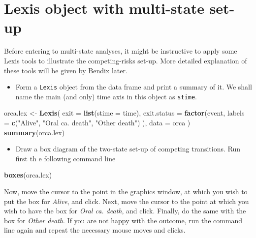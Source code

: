 \documentclass[
]{book}
\newenvironment{Shaded}{\begin{snugshade}}{\end{snugshade}}
\newcommand{\AttributeTok}[1]{\textcolor[rgb]{0.13,0.29,0.53}{#1}}
\newcommand{\FunctionTok}[1]{\textcolor[rgb]{0.13,0.29,0.53}{\textbf{#1}}}
\newcommand{\NormalTok}[1]{#1}
\newcommand{\OtherTok}[1]{\textcolor[rgb]{0.56,0.35,0.01}{#1}}
\newcommand{\StringTok}[1]{\textcolor[rgb]{0.31,0.60,0.02}{#1}}
\providecommand{\tightlist}{%
  \setlength{\itemsep}{0pt}\setlength{\parskip}{0pt}}
\begin{document}
\section{Lexis object with multi-state set-up}\label{lexis-object-with-multi-state-set-up}

Before entering to multi-state analyses, it might be instructive to apply some Lexis tools to illustrate the competing-risks set-up.
More detailed explanation of these tools will be given by Bendix later.

\begin{itemize}
\tightlist
\item
  Form a \texttt{Lexis} object from the data frame and
  print a summary of it. We shall name the main (and only) time axis
  in this object as \texttt{stime}.
\end{itemize}

\begin{Shaded}
\begin{Highlighting}[]
\NormalTok{orca.lex }\OtherTok{\textless{}{-}} \FunctionTok{Lexis}\NormalTok{(}
  \AttributeTok{exit =} \FunctionTok{list}\NormalTok{(}\AttributeTok{stime =}\NormalTok{ time),}
  \AttributeTok{exit.status =} \FunctionTok{factor}\NormalTok{(event,}
    \AttributeTok{labels =} \FunctionTok{c}\NormalTok{(}\StringTok{"Alive"}\NormalTok{, }\StringTok{"Oral ca. death"}\NormalTok{, }\StringTok{"Other death"}\NormalTok{)}
\NormalTok{  ),}
  \AttributeTok{data =}\NormalTok{ orca}
\NormalTok{)}
\FunctionTok{summary}\NormalTok{(orca.lex)}
\end{Highlighting}
\end{Shaded}

\begin{itemize}
\tightlist
\item
  Draw a box diagram of the two-state set-up of competing transitions. Run first th e following command line
\end{itemize}

\begin{Shaded}
\begin{Highlighting}[]
\FunctionTok{boxes}\NormalTok{(orca.lex)}
\end{Highlighting}
\end{Shaded}

Now, move the cursor to the point in the graphics window, at which you wish to put the box for \emph{Alive}, and click. Next, move
the cursor to the point at which you wish to have the box for \emph{Oral ca. death}, and click. Finally, do the same with the box for \emph{Other death}.
If you are not happy with the outcome, run the command line again and repeat the necessary mouse moves and clicks.
\end{document}
